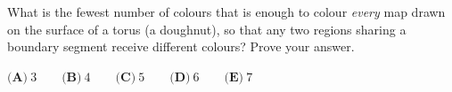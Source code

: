 What is the fewest number of colours that is enough to colour \emph{every} map drawn on the surface of a torus (a doughnut), so that any two regions sharing a boundary segment receive different colours? Prove your answer.

$\textbf{(A)}\ 3\qquad\textbf{(B)}\ 4\qquad\textbf{(C)}\ 5\qquad\textbf{(D)}\ 6\qquad\textbf{(E)}\ 7$
